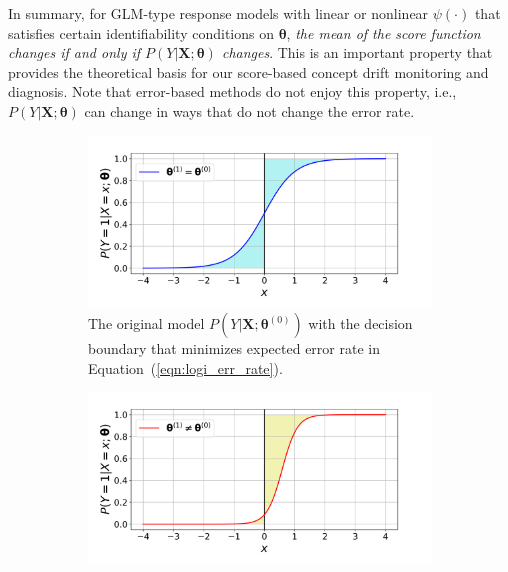 \documentclass[twoside,11pt]{article}
\begin{document}
In summary, for GLM-type response models with linear or nonlinear $\psi(\cdot)$ that satisfies certain identifiability conditions on $\bm{\theta}$, \textit{the mean of the score function changes if and only if $P(Y|\bm{X};\bm{\theta})$ changes}. This is an important property that provides the theoretical basis for our score-based concept drift monitoring and diagnosis. Note that error-based methods do not enjoy this property, i.e., $P(Y|\bm{X};\bm{\theta})$ can change in ways that do not change the error rate.

\begin{figure}[!htbp]
\centering
 \begin{subfigure}[t]{0.4\linewidth}
         \centering
         \includegraphics[width=\textwidth, trim=.2in .2in .7in .45in, clip]{../figures/v14/demons_fig/2D_logi_orig.png}
         \captionsetup{width=.95\linewidth}
         \caption{The original model $P(Y|\bm{X};\bm{\theta}^{(0)})$ with the decision boundary that minimizes expected error rate in Equation~(\ref{eqn:logi_err_rate}).}
         \label{fig:logi_err_rate_unch_a}
  \end{subfigure}
  \begin{subfigure}[t]{0.4\linewidth}
         \centering
         \includegraphics[width=\textwidth, trim=.2in .2in .7in .45in, clip]{../figures/v14/demons_fig/2D_logi_cd.png}

\end{subfigure}
\end{figure}
\end{document}
